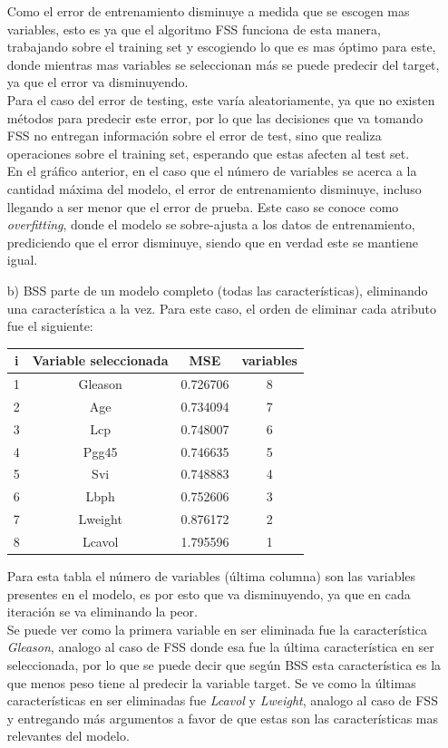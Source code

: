 \documentclass[10pt]{article}
\begin{document}
\begin{itemize}
Como el error de entrenamiento disminuye a medida que se escogen mas variables, esto es ya que el algoritmo FSS funciona de esta manera, trabajando sobre el training set y escogiendo lo que es mas óptimo para este, donde mientras mas variables se seleccionan más se puede predecir del target, ya que el error va disminuyendo. \\

Para el caso del error de testing, este varía aleatoriamente, ya que no existen métodos para predecir este error, por lo que las decisiones que va tomando FSS no entregan información sobre el error de test, sino que realiza operaciones sobre el training set, esperando que estas afecten al test set.\\
En el gráfico anterior, en el caso que el número de variables se acerca a la cantidad máxima del modelo, el error de entrenamiento disminuye, incluso llegando a ser menor que el error de prueba. Este caso se conoce como \textit{overfitting}, donde el modelo se sobre-ajusta a los datos de entrenamiento, prediciendo que el error disminuye, siendo que en verdad este se mantiene igual.

\item[b)] BSS parte de un modelo completo (todas las características), eliminando una característica a la vez. Para este caso, el orden de eliminar cada atributo fue el siguiente:

\begin{table}[!htb]
  \begin{center}
    \begin{tabular}{|c|c|c|c|} \hline
    i & Variable seleccionada & MSE & variables \\ \hline
    1 & Gleason & 0.726706 &8 \\ 
    2 & Age & 0.734094 &7 \\ 
    3 & Lcp & 0.748007 &6 \\ 
    4 & Pgg45 & 0.746635 &5 \\ 
    5 & Svi & 0.748883 &4 \\ 
    6 & Lbph & 0.752606 &3 \\ 
    7 & Lweight & 0.876172 &2 \\
    8 & Lcavol & 1.795596 &1 \\ \hline  
    \end{tabular}
  \end{center}
\end{table}
Para esta tabla el número de variables (última columna) son las variables presentes en el modelo, es por esto que va disminuyendo, ya que en cada iteración se va eliminando la peor.\\
Se puede ver como la primera variable en ser eliminada fue la característica \textit{Gleason}, analogo al caso de FSS donde esa fue la última característica en ser seleccionada, por lo que se puede decir que según BSS esta característica es la que menos peso tiene al predecir la variable target. Se ve como la últimas características en ser eliminadas fue \textit{Lcavol} y \textit{Lweight}, analogo al caso de FSS y entregando más argumentos a favor de que estas son las características mas relevantes del modelo.\\


\end{itemize}
\end{document}
